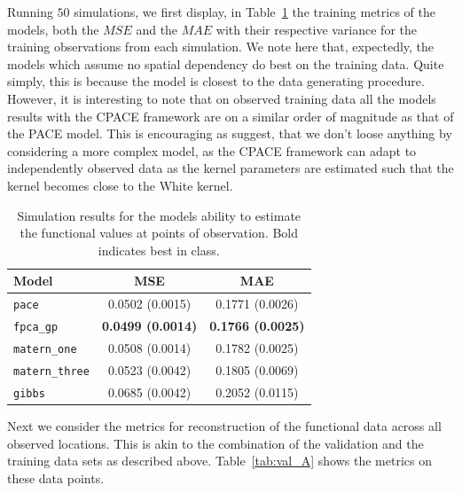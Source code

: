 Running $50$ simulations, we first display, in Table~\ref{tab:train_A} the training metrics of the models, both the $MSE$ and the $MAE$ with their respective variance for the training observations from each simulation. 
We note here that, expectedly, the models which assume no spatial dependency do best on the training data.
Quite simply, this is because the model is closest to the data generating procedure.
However, it is interesting to note that on observed training data all the models results with the CPACE framework are on a similar order of magnitude as that of the PACE model.
This is encouraging as suggest, that we don't loose anything by considering a more complex model, as the CPACE framework can adapt to independently observed data as the kernel parameters are estimated such that the kernel becomes close to the White kernel.

\begin{table}
	\caption[Simulation results for Scenario A on training data]{Simulation results for the models ability to estimate the functional values at points of observation. Bold indicates best in class.}
	\centering
	\label{tab:train_A}
	\begin{tabular}{lcc}
		\toprule
		\textbf{Model} & \textbf{MSE} & \textbf{MAE} \\
		\midrule
		\verb*|pace| & 0.0502 (0.0015) & 0.1771 (0.0026) \\
		\verb*|fpca_gp| & \textbf{0.0499 (0.0014)} & \textbf{0.1766 (0.0025)} \\
		\verb*|matern_one| & 0.0508 (0.0014) & 0.1782 (0.0025) \\
		\verb*|matern_three| & 0.0523 (0.0042) & 0.1805 (0.0069) \\
		\verb*|gibbs| & 0.0685 (0.0042) & 0.2052 (0.0115)\\
		\bottomrule
	\end{tabular}
\end{table}

Next we consider the metrics for reconstruction of the functional data across all observed locations.
This is akin to the combination of the validation and the training data sets as described above.
Table~\ref{tab:val_A} shows the metrics on these data points.

